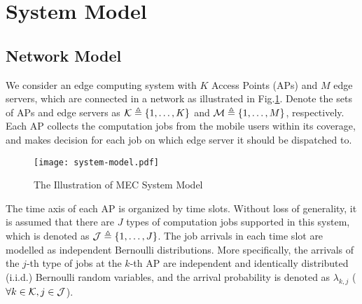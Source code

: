 \section{System Model}
\subsection{Network Model}
We consider an edge computing system with $K$ Access Points (APs) and $M$ edge servers, which are connected in a network as illustrated in Fig.\ref{fig:system}.
Denote the sets of APs and edge servers as $\mathcal{K} \triangleq \{1,\dots,K\}$ and $\mathcal{M} \triangleq \{1,\dots,M\}$, respectively.
Each AP collects the computation jobs from the mobile users within its coverage, and makes decision for each job on which edge server it should be dispatched to.

\begin{figure}[ht]
    \centering
    \texttt{[image: system-model.pdf]}
    \caption{The Illustration of MEC System Model}
    \label{fig:system}
\end{figure}

The time axis of each AP is organized by time slots.
Without loss of generality, it is assumed that there are $J$ types of computation jobs supported in this system, which is denoted as $\mathcal{J} \triangleq \{1,\dots,J\}$.
The job arrivals in each time slot are modelled as independent Bernoulli distributions.
More specifically, the arrivals of the $j$-th type of jobs at the $k$-th AP are independent and identically distributed (i.i.d.) Bernoulli random variables, and the arrival probability is denoted as $\lambda_{k,j}$ ($\forall k\in\mathcal{K}, j\in\mathcal{J}$).


